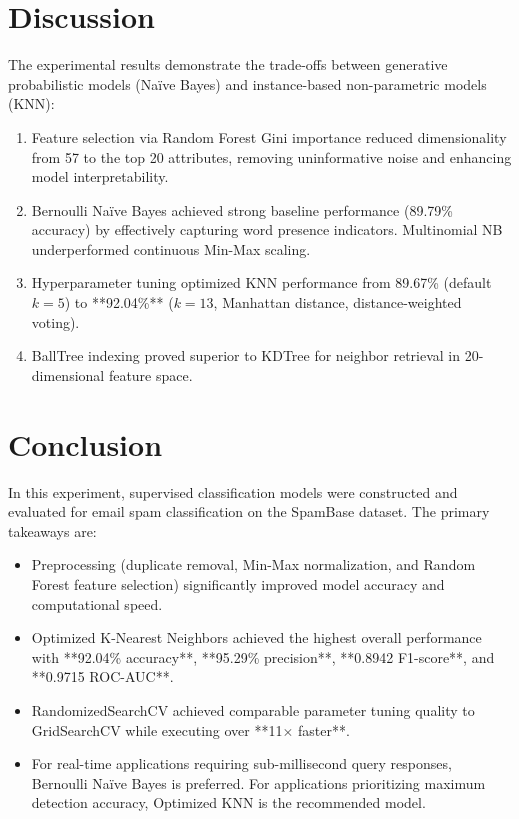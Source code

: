 \documentclass[12pt,a4paper]{article}
\begin{document}
\section{Discussion}
The experimental results demonstrate the trade-offs between generative probabilistic models (Na\"ive Bayes) and instance-based non-parametric models (KNN):
\begin{enumerate}
    \item Feature selection via Random Forest Gini importance reduced dimensionality from 57 to the top 20 attributes, removing uninformative noise and enhancing model interpretability.
    \item Bernoulli Na\"ive Bayes achieved strong baseline performance (89.79\% accuracy) by effectively capturing word presence indicators. Multinomial NB underperformed continuous Min-Max scaling.
    \item Hyperparameter tuning optimized KNN performance from 89.67\% (default $k=5$) to **92.04\%** ($k=13$, Manhattan distance, distance-weighted voting).
    \item BallTree indexing proved superior to KDTree for neighbor retrieval in 20-dimensional feature space.
\end{enumerate}

\section{Conclusion}
In this experiment, supervised classification models were constructed and evaluated for email spam classification on the SpamBase dataset. The primary takeaways are:
\begin{itemize}
    \item Preprocessing (duplicate removal, Min-Max normalization, and Random Forest feature selection) significantly improved model accuracy and computational speed.
    \item Optimized K-Nearest Neighbors achieved the highest overall performance with **92.04\% accuracy**, **95.29\% precision**, **0.8942 F1-score**, and **0.9715 ROC-AUC**.
    \item RandomizedSearchCV achieved comparable parameter tuning quality to GridSearchCV while executing over **11$\times$ faster**.
    \item For real-time applications requiring sub-millisecond query responses, Bernoulli Na\"ive Bayes is preferred. For applications prioritizing maximum detection accuracy, Optimized KNN is the recommended model.
\end{itemize}
\end{document}
